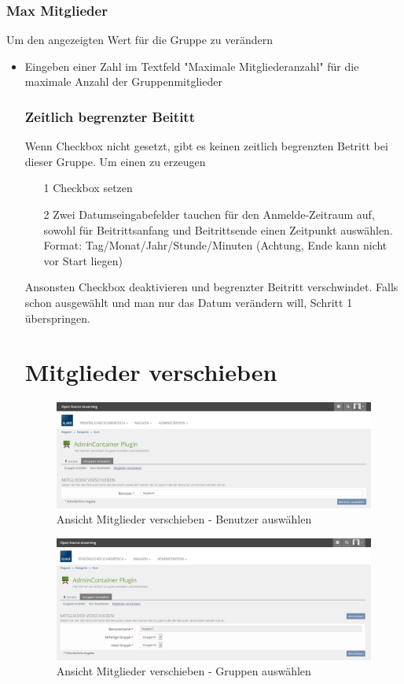 \subsubsection{Max Mitglieder}
Um den angezeigten Wert für die Gruppe zu verändern
\begin{itemize}
	\item Eingeben einer Zahl im Textfeld "Maximale Mitgliederanzahl" für die maximale Anzahl der Gruppenmitglieder 


\subsubsection{Zeitlich begrenzter Beititt}
Wenn Checkbox nicht gesetzt, gibt es keinen zeitlich begrenzten Betritt bei dieser Gruppe. Um einen zu erzeugen
\begin{itemize}
\item[1] Checkbox setzen 
\item[2] Zwei Datumseingabefelder tauchen für den Anmelde-Zeitraum auf, sowohl für Beitrittsanfang und Beitrittsende einen Zeitpunkt auswählen. Format: Tag/Monat/Jahr/Stunde/Minuten 
(Achtung, Ende kann nicht vor Start liegen)
\end{itemize}

Ansonsten Checkbox deaktivieren und begrenzter Beitritt verschwindet. 
Falls schon ausgewählt und man nur das Datum verändern will, Schritt 1 überspringen. 


\clearpage

\section{Mitglieder verschieben}
\begin{figure}
	\centering
	\includegraphics[width=1\textwidth]{img/mitgliederVerschieben1.png}
	\caption{Ansicht Mitglieder verschieben - Benutzer auswählen}
\end{figure}
\begin{figure}
	\centering
	\includegraphics[width=1\textwidth]{img/mitgliederVerschieben2.png}
	\caption{Ansicht Mitglieder verschieben - Gruppen auswählen}
\end{figure}


\end{itemize}
